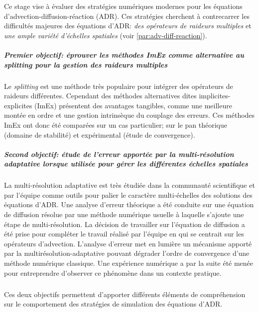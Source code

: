 Ce stage vise à évaluer des stratégies numériques modernes pour les équations d'advection-diffusion-réaction (ADR).
Ces stratégies cherchent à contrecarrer les difficultés majeures des équations d'ADR: \textit{des opérateurs de raideurs multiples} et \textit{une ample variété d'échelles spatiales} (voir \ref{par:adv-diff-reaction}).
\subparagraph{Premier objectif: éprouver les méthodes ImEx comme alternative au \textit{splitting} pour la gestion des raideurs multiples}
    Le \textit{splitting} est une méthode très populaire pour intégrer des opérateurs de raideurs différentes. 
    Cependant des méthodes alternatives dites implicites-explicites (ImEx) présentent des avantages tangibles, comme une meilleure montée en ordre et 
    une gestion intrinsèque du couplage des erreurs.
    Ces méthodes ImEx ont donc été comparées sur un cas particulier; sur le pan théorique (domaine de stabilité) et expérimental (étude de convergence).
\subparagraph{Second objectif: étude de l'erreur apportée par la multi-résolution adaptative lorsque utilisée pour gérer les différentes échelles spatiales}
    La multi-résolution adaptative est très étudiée dans la communauté scientifique et par l'équipe comme outils pour palier le caractère multi-échelles des solutions des équations d'ADR.
    Une analyse d'erreur théorique a été conduite sur une équation de diffusion résolue par une méthode numérique usuelle à laquelle s'ajoute une étape de multi-résolution.
    La décision de travailler sur l'équation de diffusion a été prise pour compléter le travail réalisé par l'équipe en \cite{belloti_et_al_2025} qui se centrait sur les opérateurs d'advection.
    L'analyse d'erreur met en lumière un mécanisme apporté par la multirésolution-adaptative pouvant dégrader l'ordre de convergence d'une méthode numérique classique.
    Une expérience numérique a par la suite été menée pour entreprendre d'observer ce phénomène dans un contexte pratique.
\subparagraph{}
Ces deux objectifs permettent d'apporter différents éléments de compréhension sur le comportement des stratégies de simulation des équations d'ADR.